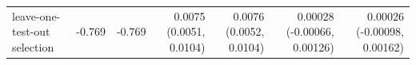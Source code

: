 \begin{tabular}{lrrrrrr}
leave-one-test-out selection & -0.769 & -0.769 & 0.0075 (0.0051, 0.0104) & 0.0076 (0.0052, 0.0104) & 0.00028 (-0.00066, 0.00126) & 0.00026 (-0.00098, 0.00162) \\

\end{tabular}
